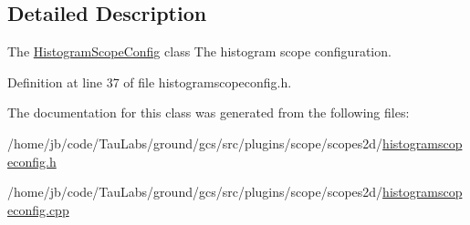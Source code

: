\subsection{\-Detailed \-Description}
\-The \hyperlink{class_histogram_scope_config}{\-Histogram\-Scope\-Config} class \-The histogram scope configuration. 

\-Definition at line 37 of file histogramscopeconfig.\-h.



\-The documentation for this class was generated from the following files\-:\begin{DoxyCompactItemize}
\item 
/home/jb/code/\-Tau\-Labs/ground/gcs/src/plugins/scope/scopes2d/\hyperlink{histogramscopeconfig_8h}{histogramscopeconfig.\-h}\item 
/home/jb/code/\-Tau\-Labs/ground/gcs/src/plugins/scope/scopes2d/\hyperlink{histogramscopeconfig_8cpp}{histogramscopeconfig.\-cpp}\end{DoxyCompactItemize}
